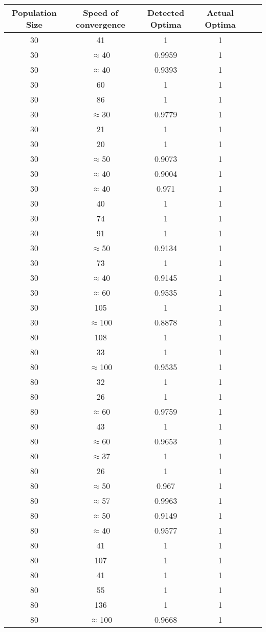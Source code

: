 \documentclass[12pt]{article}
\begin{document}
\begin{table}[h!]
\centering
\begin{tabular}{|c|c|c|c|c|c|}
\hline
\textbf{Population Size} & Speed of convergence & Detected Optima & Actual Optima \\ \hline
\hline
30 & 41 & 1 & 1 \\ \hline
30 & $\approx$40 & 0.9959 & 1 \\ \hline
30 & $\approx$40 & 0.9393 & 1 \\ \hline
30 & 60 & 1 & 1 \\ \hline
30 & 86 & 1 & 1 \\ \hline
30 & $\approx$30 & 0.9779 & 1 \\ \hline
30 & 21 & 1 & 1 \\ \hline
30 & 20 & 1 & 1 \\ \hline
30 & $\approx$50 & 0.9073 & 1 \\ \hline
30 & $\approx$40 & 0.9004 & 1 \\ \hline
30 & $\approx$40 & 0.971 & 1 \\ \hline
30 & 40 & 1 & 1 \\ \hline
30 & 74 & 1 & 1 \\ \hline
30 & 91 & 1 & 1 \\ \hline
30 & $\approx$50 & 0.9134 & 1 \\ \hline
30 & 73 & 1 & 1 \\ \hline
30 & $\approx$40 & 0.9145 & 1 \\ \hline
30 & $\approx$60 & 0.9535 & 1 \\ \hline
30 & 105 & 1 & 1 \\ \hline
30 & $\approx$100 & 0.8878 & 1 \\ \hline
80 & 108 & 1 & 1 \\ \hline
80 & 33 & 1 & 1 \\ \hline
80 & $\approx$100 & 0.9535 & 1 \\ \hline
80 & 32 & 1 & 1 \\ \hline
80 & 26 & 1 & 1 \\ \hline
80 & $\approx$60 & 0.9759 & 1 \\ \hline
80 & 43 & 1 & 1 \\ \hline
80 & $\approx$60 & 0.9653 & 1 \\ \hline
80 & $\approx$37 & 1 & 1 \\ \hline
80 & 26 & 1 & 1 \\ \hline
80 & $\approx$50 & 0.967 & 1 \\ \hline
80 & $\approx$57 & 0.9963 & 1 \\ \hline
80 & $\approx$50 & 0.9149 & 1 \\ \hline
80 & $\approx$40 & 0.9577 & 1 \\ \hline
80 & 41 & 1 & 1 \\ \hline
80 & 107 & 1 & 1 \\ \hline
80 & 41 & 1 & 1 \\ \hline
80 & 55 & 1 & 1 \\ \hline
80 & 136 & 1 & 1 \\ \hline
80 & $\approx$100 & 0.9668 & 1 \\ \hline
\end{tabular}
\end{table}
\end{document}
